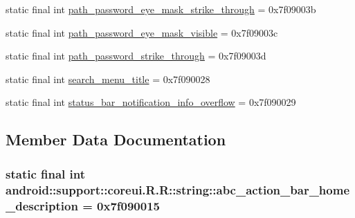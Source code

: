 \begin{CompactItemize}
\item 
static final int \hyperlink{classandroid_1_1support_1_1coreui_1_1_r_1_1string_b729f47da916e46848ae6fca8a1ce207}{path\_\-password\_\-eye\_\-mask\_\-strike\_\-through} = 0x7f09003b
\item 
static final int \hyperlink{classandroid_1_1support_1_1coreui_1_1_r_1_1string_25b6b43a8e739f5445c3f3d4db378f75}{path\_\-password\_\-eye\_\-mask\_\-visible} = 0x7f09003c
\item 
static final int \hyperlink{classandroid_1_1support_1_1coreui_1_1_r_1_1string_45534ec513aeb17f0df4a315bded6311}{path\_\-password\_\-strike\_\-through} = 0x7f09003d
\item 
static final int \hyperlink{classandroid_1_1support_1_1coreui_1_1_r_1_1string_e4e13c88f1f72faf8a32e1bbd6fbb401}{search\_\-menu\_\-title} = 0x7f090028
\item 
static final int \hyperlink{classandroid_1_1support_1_1coreui_1_1_r_1_1string_cfa5ee846c5c72c90a23ee230539191f}{status\_\-bar\_\-notification\_\-info\_\-overflow} = 0x7f090029
\end{CompactItemize}


\subsection{Member Data Documentation}
\hypertarget{classandroid_1_1support_1_1coreui_1_1_r_1_1string_d4883f3de51e555ff3eef43f4bca8899}{
\subsubsection[{abc\_\-action\_\-bar\_\-home\_\-description}]{\setlength{\rightskip}{0pt plus 5cm}static final int android::support::coreui.R.R::string::abc\_\-action\_\-bar\_\-home\_\-description = 0x7f090015}}
\label{classandroid_1_1support_1_1coreui_1_1_r_1_1string_d4883f3de51e555ff3eef43f4bca8899}



